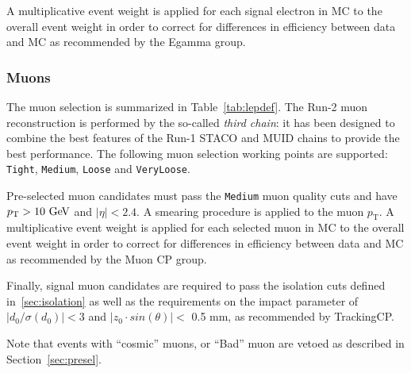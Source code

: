 A multiplicative event weight is applied for each signal electron in MC to the overall event weight 
in order to correct for differences in efficiency between data and MC as recommended by the Egamma group.

\subsubsection{Muons}
\label{sec:objects_muons}

The muon selection is summarized in Table~\ref{tab:lepdef}. The Run-2 muon reconstruction is performed by the so-called \textit{third chain}: 
it has been designed to combine the best features of the Run-1 STACO and MUID chains to provide the best performance. 
The following muon selection working points are supported:
{\tt Tight}, {\tt Medium}, {\tt Loose} and {\tt VeryLoose}. 

Pre-selected muon candidates must pass the {\tt Medium} muon quality cuts and have  $p_\mathrm{T} > 10\GeV$ and $|\eta| < 2.4$.
A smearing procedure is applied to the muon $p_\mathrm{T}$.  
A multiplicative event weight is applied for each selected muon in MC to the overall event weight in order to correct for differences in efficiency between data and MC as recommended by the Muon CP group. 

Finally, signal muon candidates are required to pass the isolation cuts defined in~\ref{sec:isolation} as well as the requirements on the impact parameter of $|d_0/\sigma(d_0)|<3$ and $|z_0 \cdot sin(\theta)|<$ 0.5 mm, as recommended by TrackingCP.


Note that events with ``cosmic'' muons, or ``Bad'' muon are vetoed as described in Section~\ref{sec:presel}.



